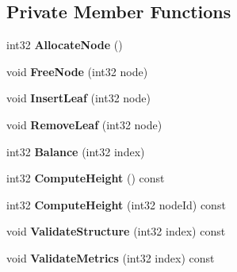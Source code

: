 \subsection*{Private Member Functions}
\begin{DoxyCompactItemize}
\item 
\mbox{\label{classb2DynamicTree_a975879e87073cfddbc6a988f0d426553}} 
int32 {\bfseries Allocate\+Node} ()
\item 
\mbox{\label{classb2DynamicTree_a87f1f5d9f4ff97b420300b6ee642ec92}} 
void {\bfseries Free\+Node} (int32 node)
\item 
\mbox{\label{classb2DynamicTree_a068fd3f29465fb6aaabbfdd6a70e6058}} 
void {\bfseries Insert\+Leaf} (int32 node)
\item 
\mbox{\label{classb2DynamicTree_a79bde2ff0a8b53b236865fdffebbd030}} 
void {\bfseries Remove\+Leaf} (int32 node)
\item 
\mbox{\label{classb2DynamicTree_aad4716f3bd40e60ba0624c75f39843fd}} 
int32 {\bfseries Balance} (int32 index)
\item 
\mbox{\label{classb2DynamicTree_a7346b235f5956de8f5e17ddf61b7d5b4}} 
int32 {\bfseries Compute\+Height} () const
\item 
\mbox{\label{classb2DynamicTree_ac86ca9626063b3b6a7e46a3313cb924d}} 
int32 {\bfseries Compute\+Height} (int32 node\+Id) const
\item 
\mbox{\label{classb2DynamicTree_a0ba41e6174a38f7c2863aeb341bab209}} 
void {\bfseries Validate\+Structure} (int32 index) const
\item 
\mbox{\label{classb2DynamicTree_a2bcea58b9deeb0bc4600cce1ee8a55e0}} 
void {\bfseries Validate\+Metrics} (int32 index) const
\end{DoxyCompactItemize}

